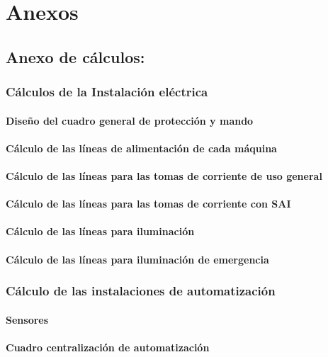 \section{Anexos}

   
\subsection{Anexo de cálculos:}

\subsubsection{Cálculos de la Instalación eléctrica}
\paragraph{Diseño del cuadro general de protección y mando}
\paragraph{Cálculo de las líneas de alimentación de cada máquina}
\paragraph{Cálculo de las líneas para las tomas de corriente de uso general}
\paragraph{Cálculo de las líneas para las tomas de corriente con SAI}
\paragraph{Cálculo de las líneas para iluminación}
\paragraph{Cálculo de las líneas para iluminación de emergencia}

\subsubsection{Cálculo de las instalaciones de automatización}
\paragraph{Sensores }
\paragraph{Cuadro centralización de automatización}
